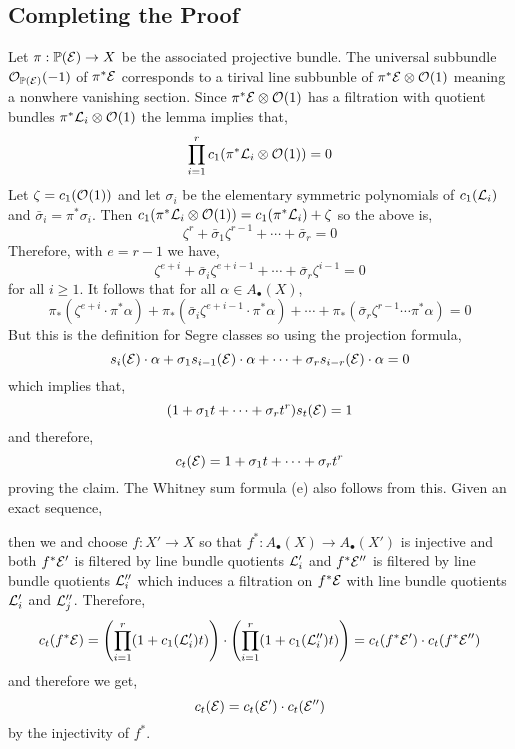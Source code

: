 \documentclass[12pt]{article}
\begin{document}
\subsection{Completing the Proof}

Let $\pi : \mathbb{P}(\mathcal{E}) \to X$ be the associated projective bundle. The universal subbundle $\mathcal{O}_{\mathbb{P}(\mathcal{E})}(-1)$ of $\pi^* \mathcal{E}$ corresponds to a tirival line subbunble of $\pi^* \mathcal{E} \otimes \mathcal{O}_{}(1)$ meaning a nonwhere vanishing section. Since $\pi^* \mathcal{E} \otimes \mathcal{O}_{}(1)$ has a filtration with quotient bundles $\pi^* \mathcal{L}_i \otimes \mathcal{O}_{}(1)$ the lemma implies that,
\[ \prod_{i = 1}^r c_1(\pi^* \mathcal{L}_i \otimes \mathcal{O}_{}(1)) = 0 \]
Let $\zeta = c_1(\mathcal{O}_{}(1))$ and let $\sigma_i$ be the elementary symmetric polynomials of $c_1(\mathcal{L}_i)$ and $\bar{\sigma}_i = \pi^* \sigma_i$. Then $c_1(\pi^* \mathcal{L}_i \otimes \mathcal{O}_{}(1)) = c_1(\pi^* \mathcal{L}_i) + \zeta$ so the above is,
\[ \zeta^r + \bar{\sigma}_1 \zeta^{r-1} + \cdots + \bar{\sigma}_r = 0 \]
Therefore, with $e = r - 1$ we have,
\[ \zeta^{e+i} + \bar{\sigma}_i \zeta^{e+i-1} + \cdots + \bar{\sigma}_r \zeta^{i-1} = 0 \]
for all $i \ge 1$. It follows that for all $\alpha \in A_\bullet(X)$, 
\[ \pi_* (\zeta^{e+i} \cdot \pi^* \alpha) + \pi_*(\bar{\sigma}_i \zeta^{e+i-1} \cdot \pi^* \alpha) + \cdots + \pi_* (\bar{\sigma}_r \zeta^{r-1} \cdots \pi^* \alpha) = 0 \]
But this is the definition for Segre classes so using the projection formula,
\[ s_i(\mathcal{E}) \cdot \alpha + \sigma_1 s_{i-1}(\mathcal{E}) \cdot \alpha + \cdots + \sigma_r s_{i-r}(\mathcal{E}) \cdot \alpha = 0 \]
which implies that,
\[ (1 + \sigma_1 t + \cdots + \sigma_r t^r) s_t(\mathcal{E}) = 1 \]
and therefore,
\[ c_t(\mathcal{E}) = 1 + \sigma_1 t + \cdots + \sigma_r t^r \]
proving the claim. The Whitney sum formula (e) also follows from this. Given an exact sequence,
\begin{center}
\end{center}
then we and choose $f : X' \to X$ so that $f^* : A_\bullet(X) \to A_\bullet(X')$ is injective and both $f^* \mathcal{E}'$ is filtered by line bundle quotients $\mathcal{L}_i'$ and $f^* \mathcal{E}''$ is filtered by line bundle quotients $\mathcal{L}_i''$ which induces a filtration on $f^* \mathcal{E}$ with line bundle quotients $\mathcal{L}_i'$ and $\mathcal{L}_j''$. Therefore,
\[ c_t(f^* \mathcal{E}) = \left( \prod_{i = 1}^r (1 + c_1(\mathcal{L}_i') t) \right) \cdot \left( \prod_{i = 1}^r (1 + c_1(\mathcal{L}_i'') t) \right) = c_t(f^* \mathcal{E}') \cdot c_t(f^* \mathcal{E}'') \]
and therefore we get,
\[ c_t(\mathcal{E}) = c_t(\mathcal{E}') \cdot c_t(\mathcal{E}'') \]
by the injectivity of $f^*$. 
\end{document}
